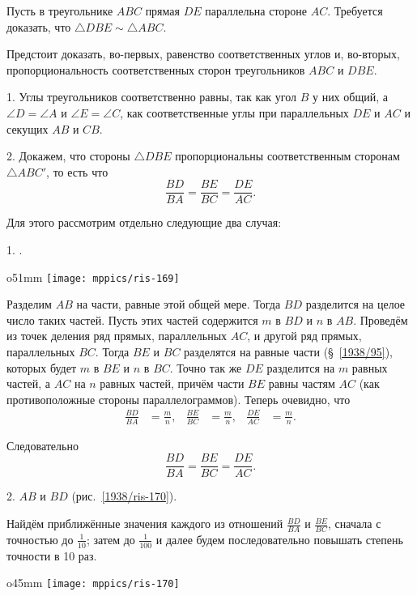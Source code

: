 Пусть в треугольнике $ABC$ прямая $DE$ параллельна стороне $AC$.
Требуется доказать, что $\triangle DBE\sim \triangle ABC$.

Предстоит доказать, во-первых, равенство соответственных углов и, во-вторых, пропорциональность соответственных сторон треугольников $ABC$ и $DBE$.

1.
Углы треугольников соответственно равны, так как угол $B$ у них общий, а $\angle D = \angle A$ и $\angle E= \angle C$, как соответственные углы при параллельных $DE$ и $AC$ и секущих $AB$ и $CB$.

2.
Докажем, что стороны $\triangle DBE$ пропорциональны соответственным сторонам $\triangle ABC'$, то есть что
\[\frac{BD}{BA}=\frac{BE}{BC}=\frac{DE}{AC}.\]

Для этого рассмотрим отдельно следующие два случая:

1.
.

\begin{wrapfigure}[13]{o}{51mm}
\centering
\texttt{[image: mppics/ris-169]}
\caption{}\label{1938/ris-169}
\end{wrapfigure}

Разделим $AB$ на части, равные этой общей мере.
Тогда $BD$ разделится на целое число таких частей.
Пусть этих частей содержится $m$ в $BD$ и $n$ в $AB$.
Проведём из точек деления ряд прямых, параллельных $AC$, и другой ряд прямых, параллельных $BC$.
Тогда $BE$ и $BC$ разделятся на равные части (§~\ref{1938/95}), которых будет $m$ в $BE$ и $n$ в $BC$.
Точно так же $DE$ разделится на $m$ равных частей, а $AC$ на $n$ равных частей, причём части $BE$ равны частям $AC$ (как противоположные стороны параллелограммов).
Теперь очевидно, что
\begin{align*}
\frac{BD}{BA}&=\frac mn,
&
\frac{BE}{BC}&=\frac mn,
&
\frac{DE}{AC}&=\frac mn.
\end{align*}



Следовательно
\[\frac{BD}{BA}=\frac{BE}{BC}=\frac{DE}{AC}.\]

2.  $AB$ и $BD$  (рис.~\ref{1938/ris-170}).

Найдём приближённые значения каждого из отношений $\frac{BD}{BA}$ и $\frac{BE}{BC}$, сначала с точностью до $\tfrac1{10}$;
затем до $\tfrac1{100}$ и далее будем последовательно повышать степень точности в 10 раз.

\begin{wrapfigure}{o}{45mm}
\centering
\texttt{[image: mppics/ris-170]}
\caption{}\label{1938/ris-170}
\end{wrapfigure}

